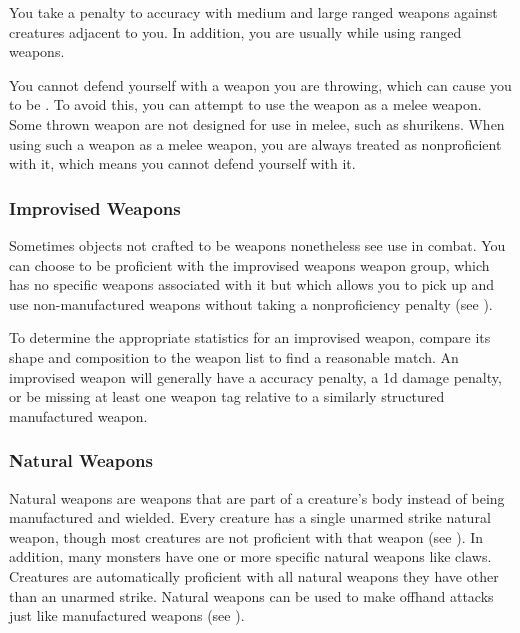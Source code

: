                 You take a  penalty to accuracy with medium and large ranged weapons against creatures adjacent to you. In addition, you are usually  while using ranged weapons.

                \label{Thrown Weapons in Melee} You cannot defend yourself with a weapon you are throwing, which can cause you to be . To avoid this, you can attempt to use the weapon as a melee weapon. Some thrown weapon are not designed for use in melee, such as shurikens. When using such a weapon as a melee weapon, you are always treated as nonproficient with it, which means you cannot defend yourself with it.

        \subsubsection{Improvised Weapons}\label{Improvised Weapons}
            Sometimes objects not crafted to be weapons nonetheless see use in combat.
            You can choose to be proficient with the improvised weapons weapon group, which has no specific weapons associated with it but which allows you to pick up and use non-manufactured weapons without taking a nonproficiency penalty (see ).

            To determine the appropriate statistics for an improvised weapon, compare its shape and composition to the weapon list to find a reasonable match.
            An improvised weapon will generally have a  accuracy penalty, a \minus1d damage penalty, or be missing at least one weapon tag relative to a similarly structured manufactured weapon.

        \subsubsection{Natural Weapons}\label{Natural Weapons}
            Natural weapons are weapons that are part of a creature's body instead of being manufactured and wielded.
            Every creature has a single unarmed strike natural weapon, though most creatures are not proficient with that weapon (see ).
            In addition, many monsters have one or more specific natural weapons like claws.
            Creatures are automatically proficient with all natural weapons they have other than an unarmed strike.
            Natural weapons can be used to make offhand attacks just like manufactured weapons (see ).

